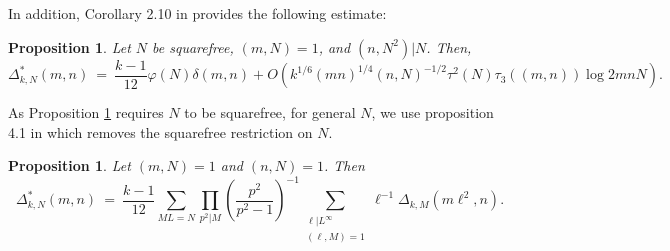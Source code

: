 \documentclass[11pt, reqno]{amsart}
\newtheorem{prop}[theorem]{Proposition}
\theoremstyle{definition}
\theoremstyle{remark}
\numberwithin{equation}{section}
\begin{document}
In addition, Corollary 2.10 in \cite{ILS2} provides the following estimate: 
\begin{prop}\label{eq:harm avg aprox}
 Let $N$ be squarefree, $(m,N)=1$, and $(n,N^2)|N$. Then,
    \begin{equation} 
        \Delta^*_{k,N}(m,n)\ =\ \frac{k-1}{12}\varphi(N)\delta(m,n)+O\left(k^{1/6}(mn)^{1/4}(n,N)^{-1/2}\tau^2(N)\tau_3((m,n))\log 2mnN \right). \label{aproxILS}
    \end{equation}
\end{prop}
  As Proposition \ref{eq:harm avg aprox} requires $N$ to be squarefree, for general $N$, we use proposition 4.1 in \cite{BarrettEtAl2016arXiv} which removes the squarefree restriction on $N$.
    \begin{prop} \label{prop:barrett}
    Let $(m,N)=1$ and $(n,N)=1$. Then
 \begin{equation} 
        \Delta^*_{k,N}(m,n)\ =\ \frac{k-1}{12}\sum_{ML=N}\prod_{p^2|M}\left( \frac{p^2}{p^2-1}\right)^{-1}\sum_{\substack{\ell |L^{\infty}\\(\ell,M)=1}}\ell^{-1}\Delta_{k,M}(m\ell^2,n).
    \end{equation}
\end{prop}
\end{document}
